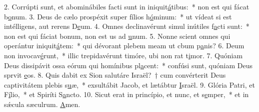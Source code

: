 2. Corrúpti sunt, et abominábiles facti sunt in iniquit\uline{á}tibus:~* non est qui fácat b\uline{o}num.
3. Deus de cælo prospéxit super fílios h\uline{ó}minum:~* ut vídeat si est intélligens, aut rerens D\uline{e}um.
4. Omnes declinavérunt simul inútiles f\uline{a}cti sunt:~* non est qui fáciat bonum, non est us ad \uline{u}num.
5. Nonne scient omnes qui operántur iniquit\uline{á}tem:~* qui dévorant plebem meam ut cbum p\uline{a}nis?
6. Deum non invocav\uline{é}runt,~* illic trepidavérunt timóre, ubi non rat t\uline{i}mor.
7. Quóniam Deus dissipávit ossa eórum qui homínibus pl\uline{a}cent:~* confúsi sunt, quóniam Deus sprvit \uline{e}os.
8. Quis dabit ex Sion salutáre Israël?~† cum convérterit Deus captivitátem plebis s\uline{u}æ,~* exsultábit Jacob, et lætábtur \uline{I}sraël.
9. Glória Patri, et F\uline{í}lio,~* et Spiríti S\uline{a}ncto.
10. Sicut erat in princípio, et nunc, et s\uline{e}mper,~* et in sǽcula sæculrum. \uline{A}men.
